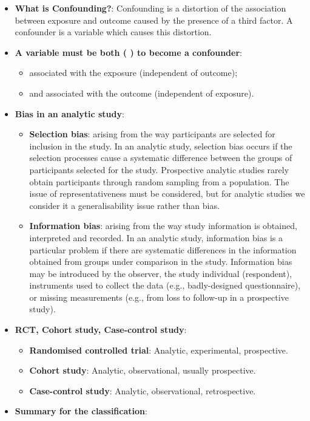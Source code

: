 \documentclass[12pt]{book}
\begin{document}
\begin{itemize}
\item \textbf{What is Confounding?}: Confounding is a distortion of the association between exposure and outcome caused by the presence of a third factor. A confounder is a variable which causes this distortion.
\item \textbf{A variable must be both ( ) to become a confounder}:
    \begin{itemize}
    \item associated with the exposure (independent of outcome);
    \item and associated with the outcome (independent of exposure).
    \end{itemize}
\item \textbf{Bias in an analytic study}:
    \begin{itemize}
    \item \textbf{Selection bias}: arising from the way participants are selected for inclusion in the study. In an analytic study, selection bias occurs if the selection processes cause a systematic difference between the groups of participants selected for the study. Prospective analytic studies rarely obtain participants through random sampling from a population. The issue of representativeness must be considered, but for analytic studies we consider it a generalisability issue rather than bias.
    \item \textbf{Information bias}: arising from the way study information is obtained, interpreted and recorded. In an analytic study, information bias is a particular problem if there are systematic differences in the information obtained from groups under comparison in the study. Information bias may be introduced by the observer, the study individual (respondent), instruments used to collect the data (e.g., badly-designed questionnaire), or missing measurements (e.g., from loss to follow-up in a prospective study).
    \end{itemize}
\item \textbf{RCT, Cohort study, Case-control study}:
    \begin{itemize}
    \item \textbf{Randomised controlled trial}: Analytic, experimental, prospective.
    \item \textbf{Cohort study}: Analytic, observational, usually prospective.
    \item \textbf{Case-control study}: Analytic, observational, retrospective.
    \end{itemize}
\item \textbf{Summary for the classification}:


\end{itemize}
\end{document}
